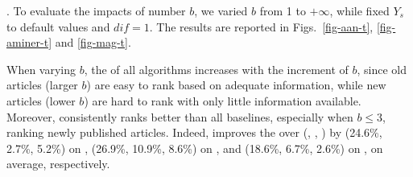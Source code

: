 


. %
To evaluate the impacts of %
number $b$, we varied $b$ from 1 to $+\infty$, while fixed $Y_s$ to default values and $dif=1$. The results are reported in Figs.~\ref{fig-aan-t}, \ref{fig-aminer-t} and \ref{fig-mag-t}.


When varying $b$, the \PairAcc of all algorithms increases with the increment of $b$, since old articles (larger $b$) are easy to rank based on adequate information, while new articles (lower $b$) are hard to rank with only little information available. Moreover, \ensemblerank consistently ranks better than all baselines, especially when $b\le3$, \ie ranking newly published articles. Indeed, \ensemblerank improves the \PairAcc over (\pagerank, \futurerank, \hhgrank) by (24.6\%, 2.7\%, 5.2\%) on \aan, (26.9\%, 10.9\%, 8.6\%) on \aminer, and (18.6\%, 6.7\%, 2.6\%) on \magdata, on average, respectively.


